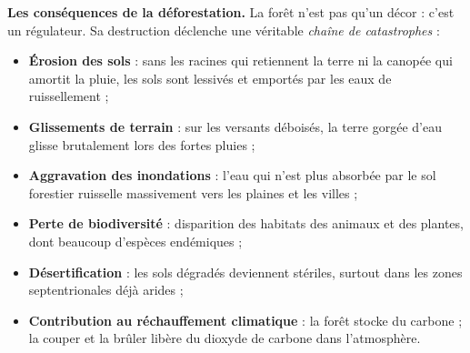 \documentclass[11pt]{article}
\begin{document}
\textbf{Les conséquences de la déforestation.} La forêt n'est pas qu'un décor : c'est un régulateur. Sa destruction déclenche une véritable \emph{chaîne de catastrophes} :
\begin{itemize}
\item \textbf{Érosion des sols} : sans les racines qui retiennent la terre ni la canopée qui amortit la pluie, les sols sont lessivés et emportés par les eaux de ruissellement ;
\item \textbf{Glissements de terrain} : sur les versants déboisés, la terre gorgée d'eau glisse brutalement lors des fortes pluies ;
\item \textbf{Aggravation des inondations} : l'eau qui n'est plus absorbée par le sol forestier ruisselle massivement vers les plaines et les villes ;
\item \textbf{Perte de biodiversité} : disparition des habitats des animaux et des plantes, dont beaucoup d'espèces endémiques ;
\item \textbf{Désertification} : les sols dégradés deviennent stériles, surtout dans les zones septentrionales déjà arides ;
\item \textbf{Contribution au réchauffement climatique} : la forêt stocke du carbone ; la couper et la brûler libère du dioxyde de carbone  dans l'atmosphère.
\end{itemize}
\end{document}
